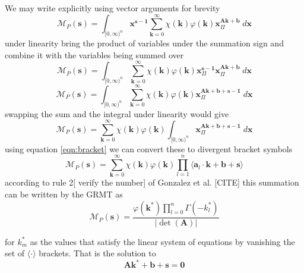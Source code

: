 \documentclass[journal=jcisd8,manuscript=article,layout=onecolumn,pdftex,floatfix,amsmath,amssymb,10pt]{achemso}
\begin{document}
We may write explicitly using vector arguments for brevity
\begin{equation}
\mathcal{M}_P(\mathbf{s}) = \int_{[0,\infty)^{n}} \mathbf{x}^{\mathbf{s-1}} \sum_{\mathbf{k}=0}^\infty  \chi(\mathbf{k})\varphi(\mathbf{k}) \mathbf{x}^{\mathbf{A}\mathbf{k}+\mathbf{b}}_\Pi \; d \mathbf{x}
\end{equation}
under linearity bring the product of variables under the summation sign and combine it with the variables being summed over
\begin{equation}
\mathcal{M}_P(\mathbf{s}) = \int_{[0,\infty)^{n}} \sum_{\mathbf{k}=0}^\infty  \chi(\mathbf{k})\varphi(\mathbf{k}) \mathbf{x}^{\mathbf{s-1}}_\Pi \mathbf{x}^{\mathbf{A}\mathbf{k}+\mathbf{b}}_\Pi \; d \mathbf{x}
\end{equation}
\begin{equation}
\mathcal{M}_P(\mathbf{s}) = \int_{[0,\infty)^{n}} \sum_{\mathbf{k}=0}^\infty  \chi(\mathbf{k})\varphi(\mathbf{k})\mathbf{x}^{\mathbf{A}\mathbf{k}+\mathbf{b}+\mathbf{s-1}}_\Pi \; d \mathbf{x}
\end{equation}
swapping the sum and the integral under linearity would give
\begin{equation}
\mathcal{M}_P(\mathbf{s}) = \sum_{\mathbf{k}=0}^\infty  \chi(\mathbf{k})\varphi(\mathbf{k})\int_{[0,\infty)^{n}} \mathbf{x}^{\mathbf{A}\mathbf{k}+\mathbf{b}+\mathbf{s-1}}_\Pi \; d \mathbf{x}
\end{equation}
using equation \ref{eqn:bracket} we can convert these to divergent bracket symbols
\begin{equation}
\mathcal{M}_P(\mathbf{s}) = \sum_{\mathbf{k}=0}^\infty  \chi(\mathbf{k})\varphi(\mathbf{k}) \prod_{l=1}^n \langle \mathbf{a}_l \cdot \mathbf{k} + \mathbf{b} + \mathbf{s} \rangle
\end{equation}
according to rule 2[{\color{red} verify the number}] of Gonzalez et al. [CITE] this summation can be written by the GRMT as 
\begin{equation}
\mathcal{M}_P(\mathbf{s}) = \frac{\varphi(\mathbf{k}^*) \prod_{l=0}^n \Gamma(-k_l^*)}{|\det(\mathbf{A})|}
\end{equation}

for $k^*_m$ as the values that satisfy the linear system of equations by vanishing the set of $\langle \cdot \rangle$ brackets. That is the solution to \begin{equation}
\mathbf{A}\mathbf{k}^*+\mathbf{b}+\mathbf{s} = \mathbf{0}
\end{equation} 
\end{document}

